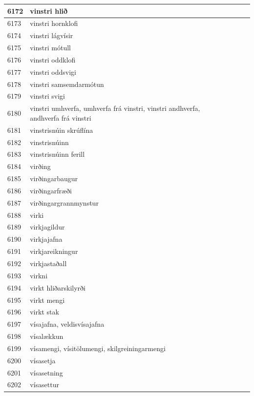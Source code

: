 \begin{longtable}{p{}|p{}|p{}|p{}|p{}}
\hline
6172 & vinstri hlið &  &  &  \\
\hline
6173 & vinstri hornklofi &  &  &  \\
\hline
6174 & vinstri lágvísir &  &  &  \\
\hline
6175 & vinstri mótull &  &  &  \\
\hline
6176 & vinstri oddklofi &  &  &  \\
\hline
6177 & vinstri oddsvigi &  &  &  \\
\hline
6178 & vinstri samsemdarmótun &  &  &  \\
\hline
6179 & vinstri svigi &  &  &  \\
\hline
6180 & vinstri umhverfa, umhverfa frá vinstri, vinstri andhverfa, andhverfa frá vinstri &  &  &  \\
\hline
6181 & vinstrisnúin skrúflína &  &  &  \\
\hline
6182 & vinstrisnúinn &  &  &  \\
\hline
6183 & vinstrisnúinn ferill &  &  &  \\
\hline
6184 & virðing &  &  &  \\
\hline
6185 & virðingarbaugur &  &  &  \\
\hline
6186 & virðingarfræði &  &  &  \\
\hline
6187 & virðingargrannmynstur &  &  &  \\
\hline
6188 & virki &  &  &  \\
\hline
6189 & virkjagildur &  &  &  \\
\hline
6190 & virkjajafna &  &  &  \\
\hline
6191 & virkjareikningur &  &  &  \\
\hline
6192 & virkjastaðall &  &  &  \\
\hline
6193 & virkni &  &  &  \\
\hline
6194 & virkt hliðarskilyrði &  &  &  \\
\hline
6195 & virkt mengi &  &  &  \\
\hline
6196 & virkt stak &  &  &  \\
\hline
6197 & vísajafna, veldisvísajafna &  &  &  \\
\hline
6198 & vísalækkun &  &  &  \\
\hline
6199 & vísamengi, vísitölumengi, skilgreiningarmengi &  &  &  \\
\hline
6200 & vísasetja &  &  &  \\
\hline
6201 & vísasetning &  &  &  \\
\hline
6202 & vísasettur &  &  &  \\

\end{longtable}
